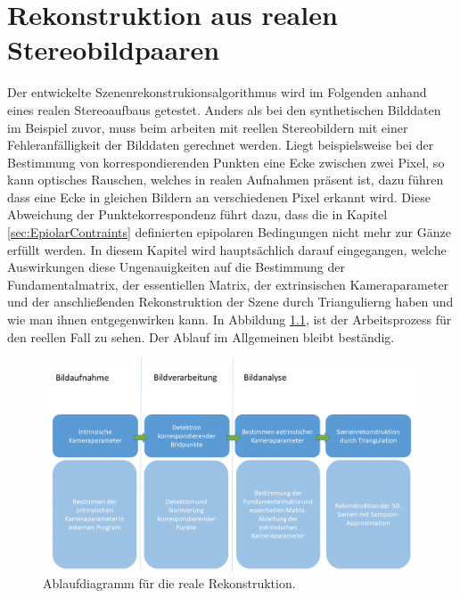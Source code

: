 \chapter{Rekonstruktion aus realen Stereobildpaaren}
\label{sec:real} 

Der entwickelte Szenenrekonstrukionsalgorithmus wird im Folgenden anhand eines realen Stereoaufbaus getestet. Anders als bei den synthetischen Bilddaten im Beispiel zuvor, muss beim arbeiten mit reellen Stereobildern mit einer Fehleranfälligkeit der Bilddaten gerechnet werden. Liegt beispielsweise bei der Bestimmung von korrespondierenden Punkten eine Ecke zwischen zwei Pixel, so kann optisches Rauschen, welches in realen Aufnahmen präsent ist, dazu führen dass eine Ecke in gleichen Bildern an verschiedenen Pixel erkannt wird. Diese Abweichung der Punktekorrespondenz führt dazu, dass die in Kapitel \ref{sec:EpiolarContraints} definierten epipolaren Bedingungen nicht mehr zur Gänze erfüllt werden. In diesem Kapitel wird hauptsächlich darauf eingegangen, welche Auswirkungen diese Ungenauigkeiten auf die Bestimmung der Fundamentalmatrix, der essentiellen Matrix, der extrinsischen Kameraparameter und der anschließenden Rekonstruktion der Szene durch Triangulierng haben und wie man ihnen entgegenwirken kann. In Abbildung \ref{fig:ArbeitsProzessReell}, ist der Arbeitsprozess für den reellen Fall zu sehen. Der Ablauf im Allgemeinen bleibt beständig.

%

\begin{figure}[!htb]
	\centering
	\includegraphics[width=1.\linewidth]{images/NEU_real_Arbeitsprozess.png}
	\caption[Ablaufdiagramm für die reale Rekonstruktion]{Ablaufdiagramm für die reale Rekonstruktion.}
	\label{fig:ArbeitsProzessReell}
\end{figure}

